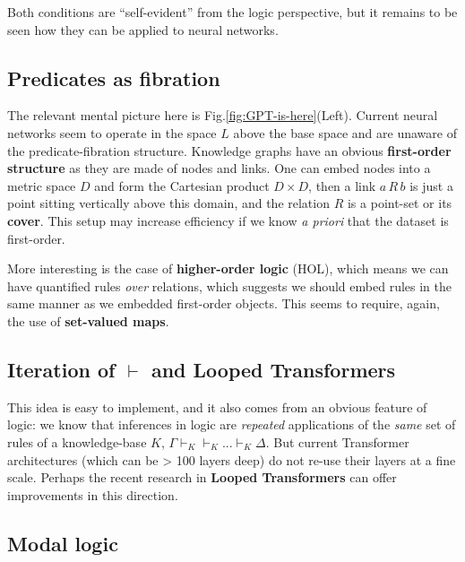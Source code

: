 \documentclass[runningheads]{llncs}
\begin{document}
Both conditions are ``self-evident'' from the logic perspective, but it remains to be seen how they can be applied to neural networks.

\subsection{Predicates as fibration}

The relevant mental picture here is Fig.\ref{fig:GPT-is-here}(Left). Current neural networks seem to operate in the space $L$ above the base space and are unaware of the predicate-fibration structure.  Knowledge graphs have an obvious \textbf{first-order structure} as they are made of nodes and links.  One can embed nodes into a metric space $D$ and form the Cartesian product $D \times D$, then a link $a\,R\,b$ is just a point sitting vertically above this domain, and the relation $R$ is a point-set or its \textbf{cover}.  This setup may increase efficiency if we know \textit{a priori} that the dataset is first-order.

More interesting is the case of \textbf{higher-order logic} (HOL), which means we can have quantified rules \textit{over} relations, which suggests we should embed rules in the same manner as we embedded first-order objects.  This seems to require, again, the use of \textbf{set-valued maps}.

\subsection{Iteration of $\vdash$ and Looped Transformers}

This idea is easy to implement, and it also comes from an obvious feature of logic:  we know that inferences in logic are \textit{repeated} applications of the \textit{same} set of rules of a knowledge-base $K$, $\Gamma \vdash_K \vdash_K ... \vdash_K \Delta$.  But current Transformer architectures (which can be > 100 layers deep) do not re-use their layers at a fine scale.  Perhaps the recent research in \textbf{Looped Transformers} \cite{Yang2024} \cite{Giannou2023} can offer improvements in this direction.

\subsection{Modal logic}
\end{document}
